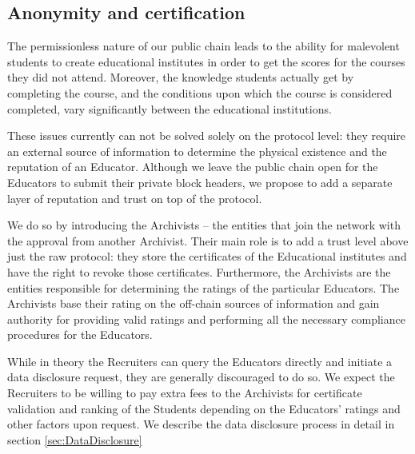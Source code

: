 \subsection{Anonymity and certification}
\label{sec:cert}
The permissionless nature of our public chain leads to the ability for malevolent students to create educational institutes in order to get the scores for the courses they did not attend. Moreover, the knowledge students actually get by completing the course, and the conditions upon which the course is considered completed, vary significantly between the educational institutions.

These issues currently can not be solved solely on the protocol level: they require an external source of information to determine the physical existence and the reputation of an Educator. Although we leave the public chain open for the Educators to submit their private block headers, we propose to add a separate layer of reputation and trust on top of the protocol.

We do so by introducing the Archivists -- the entities that join the network with the approval from another Archivist. Their main role is to add a trust level above just the raw protocol: they store the certificates of the Educational institutes and have the right to revoke those certificates. Furthermore, the Archivists are the entities responsible for determining the ratings of the particular Educators. The Archivists base their rating on the off-chain sources of information and gain authority for providing valid ratings and performing all the necessary compliance procedures for the Educators.

While in theory the Recruiters can query the Educators directly and initiate a data disclosure request, they are generally discouraged to do so. We expect the Recruiters to be willing to pay extra fees to the Archivists for certificate validation and ranking of the Students depending on the Educators' ratings and other factors upon request. We describe the data disclosure process in detail in section \ref{sec:DataDisclosure}
